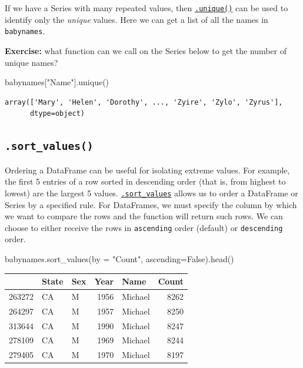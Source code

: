 \documentclass[
  letterpaper,
  DIV=11,
  numbers=noendperiod]{scrreprt}
\newenvironment{Shaded}{\begin{snugshade}}{\end{snugshade}}
\newcommand{\NormalTok}[1]{\textcolor[rgb]{0.00,0.23,0.31}{#1}}
\newcommand{\OperatorTok}[1]{\textcolor[rgb]{0.37,0.37,0.37}{#1}}
\newcommand{\StringTok}[1]{\textcolor[rgb]{0.13,0.47,0.30}{#1}}
\newcommand{\VariableTok}[1]{\textcolor[rgb]{0.07,0.07,0.07}{#1}}
\begin{document}
If we have a Series with many repeated values, then
\href{https://pandas.pydata.org/docs/reference/api/pandas.unique.html}{\texttt{.unique()}}
can be used to identify only the \emph{unique} values. Here we can get a
list of all the names in \texttt{babynames}.

\textbf{Exercise:} what function can we call on the Series below to get
the number of unique names?

\begin{Shaded}
\begin{Highlighting}[]
\NormalTok{babynames[}\StringTok{"Name"}\NormalTok{].unique()}
\end{Highlighting}
\end{Shaded}

\begin{verbatim}
array(['Mary', 'Helen', 'Dorothy', ..., 'Zyire', 'Zylo', 'Zyrus'],
      dtype=object)
\end{verbatim}

\hypertarget{sort_values}{%
\subsection{\texorpdfstring{\texttt{.sort\_values()}}{.sort\_values()}}\label{sort_values}}

Ordering a DataFrame can be useful for isolating extreme values. For
example, the first 5 entries of a row sorted in descending order (that
is, from highest to lowest) are the largest 5 values.
\href{https://pandas.pydata.org/docs/reference/api/pandas.DataFrame.sort_values.html}{\texttt{.sort\_values}}
allows us to order a DataFrame or Series by a specified rule. For
DataFrames, we must specify the column by which we want to compare the
rows and the function will return such rows. We can choose to either
receive the rows in \texttt{ascending} order (default) or
\texttt{descending} order.

\begin{Shaded}
\begin{Highlighting}[]
\NormalTok{babynames.sort\_values(by }\OperatorTok{=} \StringTok{"Count"}\NormalTok{, ascending}\OperatorTok{=}\VariableTok{False}\NormalTok{).head()}
\end{Highlighting}
\end{Shaded}

\begin{tabular}{lllrlr}
\toprule
{} & State & Sex &  Year &     Name &  Count \\
\midrule
263272 &    CA &   M &  1956 &  Michael &   8262 \\
264297 &    CA &   M &  1957 &  Michael &   8250 \\
313644 &    CA &   M &  1990 &  Michael &   8247 \\
278109 &    CA &   M &  1969 &  Michael &   8244 \\
279405 &    CA &   M &  1970 &  Michael &   8197 \\
\bottomrule
\end{tabular}
\end{document}
